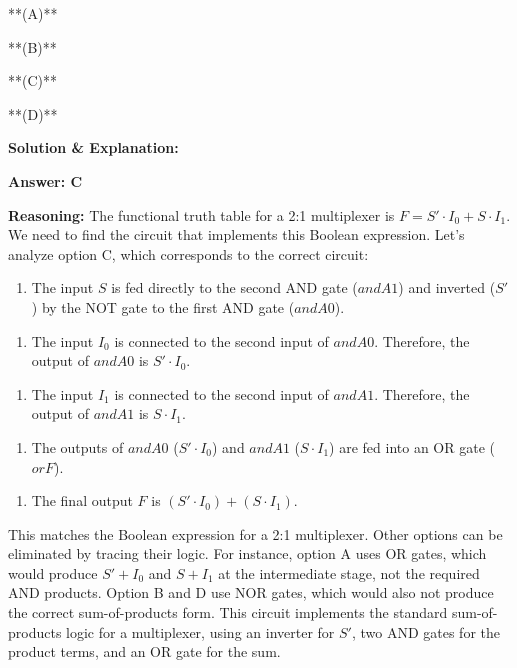 \documentclass{article}
\begin{document}
**(A)** 

**(B)** 

**(C)** 

**(D)** 

\textbf{Solution \& Explanation:}

\textbf{Answer: C}

\textbf{Reasoning:} The functional truth table for a 2:1 multiplexer is $F = S' \cdot I_0 + S \cdot I_1$. We need to find the circuit that implements this Boolean expression. Let's analyze option C, which corresponds to the correct circuit:

\begin{enumerate}
\item The input $S$ is fed directly to the second AND gate ($andA1$) and inverted ($S'$) by the NOT gate to the first AND gate ($andA0$).

\end{enumerate}
\begin{enumerate}
\item The input $I_0$ is connected to the second input of $andA0$. Therefore, the output of $andA0$ is $S' \cdot I_0$.

\end{enumerate}
\begin{enumerate}
\item The input $I_1$ is connected to the second input of $andA1$. Therefore, the output of $andA1$ is $S \cdot I_1$.

\end{enumerate}
\begin{enumerate}
\item The outputs of $andA0$ ($S' \cdot I_0$) and $andA1$ ($S \cdot I_1$) are fed into an OR gate ($orF$).

\end{enumerate}
\begin{enumerate}
\item The final output $F$ is $(S' \cdot I_0) + (S \cdot I_1)$.

\end{enumerate}
This matches the Boolean expression for a 2:1 multiplexer. Other options can be eliminated by tracing their logic. For instance, option A uses OR gates, which would produce $S' + I_0$ and $S + I_1$ at the intermediate stage, not the required AND products. Option B and D use NOR gates, which would also not produce the correct sum-of-products form. This circuit implements the standard sum-of-products logic for a multiplexer, using an inverter for $S'$, two AND gates for the product terms, and an OR gate for the sum.
\end{document}
